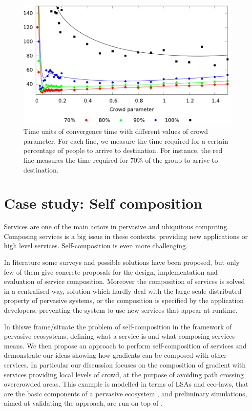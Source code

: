 \documentclass[12pt,a4paper,twoside,openright]{book}
\begin{document}
\begin{figure}
\begin{center}
   \includegraphics[width=0.99\columnwidth]{img/jos-graph}
   \vspace{-10pt}\caption[Crowd parameter]{Time units of convergence time with different values of crowd parameter. For each line, we measure the time required for a certain percentage of people to arrive to destination. For instance, the red line measures the time required for 70\% of the group to arrive to destination.}\label{img:jos-graph}
\end{center}
\end{figure}


\chapter{Case study: Self composition}

Services are one of the main actors in pervasive and ubiquitous computing. 
%
Composing services is a big issue in these contexts, providing new applications or high level services.
%
Self-composition is even more challenging.

In literature some surveys and possible solutions have been proposed, but only few of them give concrete proposals for the design, implementation and evaluation of service composition.
%
Moreover the composition of services is solved in a centralised way, solution which hardly deal with the large-scale distributed property of pervasive systems, or the composition is specified by the application developers, preventing the system to use new services that appear at runtime.

In this\levelText{}we frame/situate the problem of self-composition in the framework of pervasive ecosystems, defining what a service is and what composing services means. 
%
We then propose an approach to perform self-composition of services and demonstrate our ideas showing how gradients can be composed with other services. 
%
In particular our discussion focuses on the composition of gradient with services providing local levels of crowd, at the purpose of avoiding path crossing overcrowded areas.
%
This example is modelled in terms of LSAs and eco-laws, that are the basic components of a pervasive ecosystem \cite{sapereecolaws-sac2012}, and preliminary simulations, aimed at validating the approach, are run on top of \alchemist{}.
\end{document}
